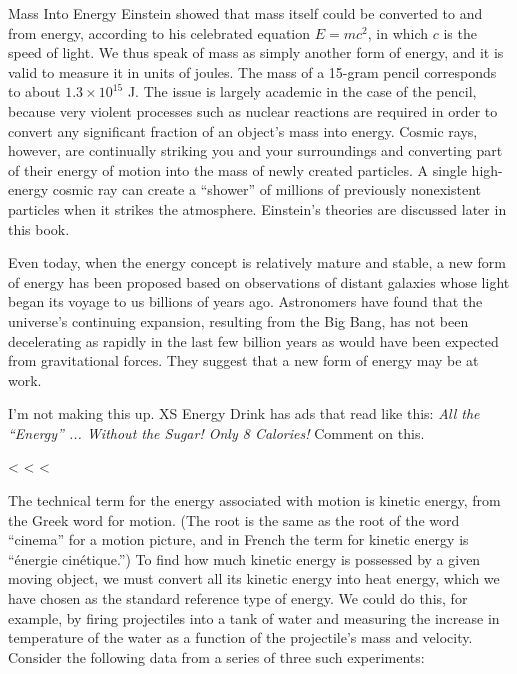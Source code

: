 \begin{optionaltopic}{Mass Into Energy}
Einstein showed that mass itself
could be converted to and from  energy,
according to his celebrated
equation $E=mc^2$, in which $c$ is the
speed of light. We thus speak of
mass as simply another form of
energy, and it is valid to measure
it in units of joules. The mass of a
15-gram pencil corresponds to
about $1.3\times10^{15}$ J. The issue is
largely academic in the case of the
pencil, because very violent processes
 such as nuclear reactions
are required in order to convert any
significant fraction of an object's
mass into energy. Cosmic rays,
however, are continually striking
you and your surroundings and
converting part of their energy of
motion into the mass of newly created
particles. A single high-energy
cosmic ray can create a ``shower''
of millions of previously nonexistent
particles when it strikes the 
atmosphere. Einstein's theories are
discussed later in this book.

Even today, when the energy 
concept is relatively mature and stable,
a new form of energy has been
proposed based on observations
of distant galaxies whose light 
began its voyage to us billions of
years ago. Astronomers have
found that the universe's continuing expansion, resulting from the
Big Bang, has not been decelerating
 as rapidly in the last few billion
years as would have been
expected from gravitational forces.
They suggest that a new form of
energy may be at work.
\end{optionaltopic}


\startdq

\begin{dq}
I'm not making this up. XS Energy Drink has ads that read
like this: \emph{All the ``Energy'' ... Without the Sugar! Only 8
Calories!} Comment on this.
\end{dq}

<%
<%
<%

The technical term for the energy associated with motion is
kinetic energy, from the Greek word
for motion. (The root is the same as the root of the word ``cinema''
for a motion picture,
and in French the term for kinetic energy is
``\'{e}nergie cin\'{e}tique.'') To find how much kinetic energy is
possessed by a given moving object, we must convert all its
kinetic energy into heat energy, which we have chosen as the
standard reference type of energy. We could do this, for
example, by firing projectiles into a tank of water and
measuring the increase in temperature of the water as a
function of the projectile's mass and velocity. Consider the
following data from a series of three such experiments:

